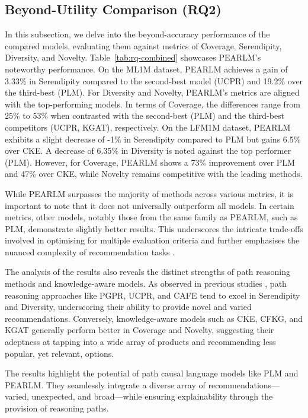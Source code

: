 \documentclass[sigconf]{acmart}
\begin{document}
\subsection{Beyond-Utility Comparison (RQ2)}
\label{sec:rq2}
In this subsection, we delve into the beyond-accuracy performance of the compared models, evaluating them against metrics of Coverage, Serendipity, Diversity, and Novelty.
Table~\ref{tab:rq-combined} showcases PEARLM's noteworthy performance. On the ML1M dataset, PEARLM achieves a gain of 3.33\% in Serendipity compared to the second-best model (UCPR) and 19.2\% over the third-best (PLM). For Diversity and Novelty, PEARLM's metrics are aligned with the top-performing models. In terms of Coverage, the differences range from 25\% to 53\% when contrasted with the second-best (PLM) and the third-best competitors (UCPR, KGAT), respectively. On the LFM1M dataset, PEARLM exhibits a slight decrease of -1\% in Serendipity compared to PLM but gains 6.5\% over CKE. A decrease of 6.35\% in Diversity is noted against the top performer (PLM). However, for Coverage, PEARLM shows a 73\% improvement over PLM and 47\% over CKE, while Novelty remains competitive with the leading methods.

While PEARLM surpasses the majority of methods across various metrics, it is important to note that it does not universally outperform all models. In certain metrics, other models, notably those from the same family as PEARLM, such as PLM, demonstrate slightly better results. This underscores the intricate trade-offs involved in optimising for multiple evaluation criteria and further emphasises the nuanced complexity of recommendation tasks \cite{10.1145/3523227.3547425}.

The analysis of the results also reveals the distinct strengths of path reasoning methods and knowledge-aware models. As observed in previous studies \cite{10.1007/978-3-031-28241-6_1}, path reasoning approaches like PGPR, UCPR, and CAFE tend to excel in Serendipity and Diversity, underscoring their ability to provide novel and varied recommendations. Conversely, knowledge-aware models such as CKE, CFKG, and KGAT generally perform better in Coverage and Novelty, suggesting their adeptness at tapping into a wide array of products and recommending less popular, yet relevant, options.

The results highlight the potential of path causal language models like PLM and PEARLM. They seamlessly integrate a diverse array of recommendations—varied, unexpected, and broad—while ensuring explainability through the provision of reasoning paths.
\end{document}
